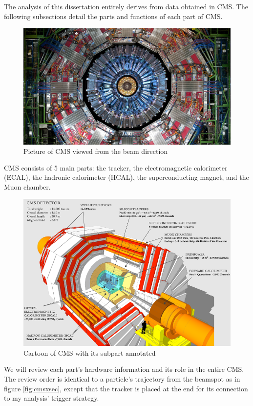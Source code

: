 The analysis of this dissertation entirely derives from data obtained in CMS.
The following subsections detail the parts and functions of each part of CMS.
\begin{figure}[h!]
	\caption{Picture of CMS viewed from the beam direction \cite{det}}
  \label{fig:cms}
  \centering
  \includegraphics[width=1.0\linewidth]{figs/cms.png}
\end{figure}
CMS consists of 5 main parts: the tracker, the electromagnetic calorimeter (ECAL), the hadronic calorimeter (HCAL), the superconducting magnet, and the Muon chamber.
\begin{figure}[h!]
	\caption{Cartoon of CMS with its subpart annotated \cite{xsec}}
  \label{fig:CMS}
  \centering
  \includegraphics[width=0.87\linewidth]{figs/CMS.png}
\end{figure}
We will review each part's hardware information and its role in the entire CMS.
The review order is identical to a particle's trajectory from the beamspot as in figure \ref{fig:cmsxsec}, except that the tracker is placed at the end for its connection to my analysis' trigger strategy.
